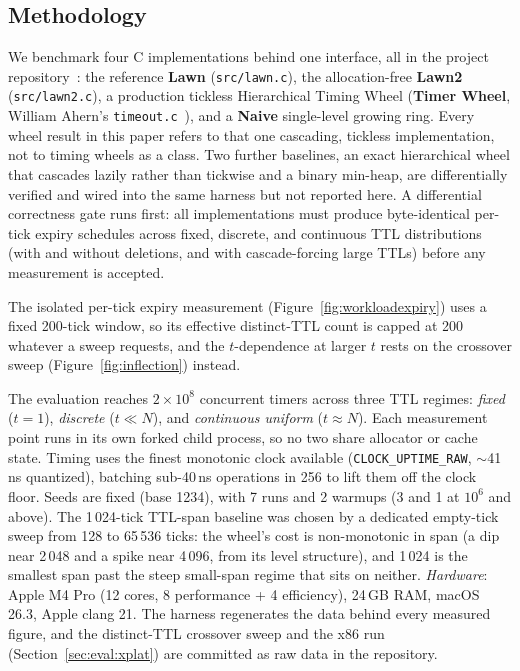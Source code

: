 \documentclass[conference]{IEEEtran}
\begin{document}
\subsection{Methodology}
We benchmark four C implementations behind one interface, all in the project repository~\cite{GH}: the reference \textbf{Lawn} (\texttt{src/lawn.c}), the allocation-free \textbf{Lawn2} (\texttt{src/lawn2.c}), a production tickless Hierarchical Timing Wheel (\textbf{Timer Wheel}, William Ahern's \texttt{timeout.c}~\cite{TWI}), and a \textbf{Naive} single-level growing ring. Every wheel result in this paper refers to that one cascading, tickless implementation, not to timing wheels as a class. Two further baselines, an exact hierarchical wheel that cascades lazily rather than tickwise and a binary min-heap, are differentially verified and wired into the same harness but not reported here. A differential correctness gate runs first: all implementations must produce byte-identical per-tick expiry schedules across fixed, discrete, and continuous TTL distributions (with and without deletions, and with cascade-forcing large TTLs) before any measurement is accepted.

The isolated per-tick expiry measurement (Figure~\ref{fig:workloadexpiry}) uses a fixed 200-tick window, so its effective distinct-TTL count is capped at 200 whatever a sweep requests, and the $t$-dependence at larger $t$ rests on the crossover sweep (Figure~\ref{fig:inflection}) instead.

The evaluation reaches $2\times10^8$ concurrent timers across three TTL regimes: \emph{fixed} ($t=1$), \emph{discrete} ($t \ll N$), and \emph{continuous uniform} ($t \approx N$). Each measurement point runs in its own forked child process, so no two share allocator or cache state. Timing uses the finest monotonic clock available (\texttt{CLOCK\_UPTIME\_RAW}, $\sim$41\,ns quantized), batching sub-40\,ns operations in 256 to lift them off the clock floor. Seeds are fixed (base 1234), with 7 runs and 2 warmups (3 and 1 at $10^6$ and above). The 1\,024-tick TTL-span baseline was chosen by a dedicated empty-tick sweep from 128 to 65\,536 ticks: the wheel's cost is non-monotonic in span (a dip near 2\,048 and a spike near 4\,096, from its level structure), and 1\,024 is the smallest span past the steep small-span regime that sits on neither. \emph{Hardware}: Apple M4 Pro (12 cores, 8 performance + 4 efficiency), 24\,GB RAM, macOS 26.3, Apple clang 21. The harness regenerates the data behind every measured figure, and the distinct-TTL crossover sweep and the x86 run (Section~\ref{sec:eval:xplat}) are committed as raw data in the repository.
\end{document}
